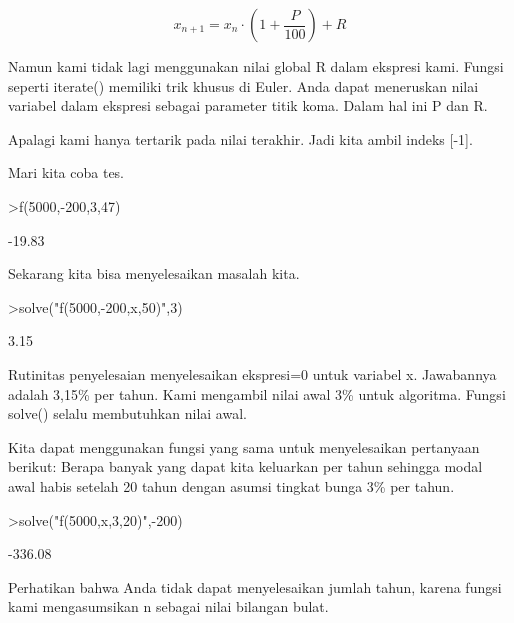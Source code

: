 \documentclass[a4paper,10pt]{article}
\begin{document}
\begin{eulernotebook}
\begin{eulercomment}
\begin{eulercomment}
\begin{eulercomment}
\begin{eulercomment}
\begin{eulercomment}
\begin{eulercomment}
\begin{eulercomment}
\begin{eulercomment}
\begin{eulercomment}
\end{eulercomment}
\begin{eulerformula}
\[
x_{n+1} = x_n \cdot \left(1+ \frac{P}{100}\right) + R
\]
\end{eulerformula}
\begin{eulercomment}
Namun kami tidak lagi menggunakan nilai global R dalam ekspresi kami.
Fungsi seperti iterate() memiliki trik khusus di Euler. Anda dapat
meneruskan nilai variabel dalam ekspresi sebagai parameter titik koma.
Dalam hal ini P dan R.

Apalagi kami hanya tertarik pada nilai terakhir. Jadi kita ambil
indeks [-1].

Mari kita coba tes.
\end{eulercomment}
\begin{eulerprompt}
>f(5000,-200,3,47)
\end{eulerprompt}
\begin{euleroutput}
       -19.83 
\end{euleroutput}
\begin{eulercomment}
Sekarang kita bisa menyelesaikan masalah kita.
\end{eulercomment}
\begin{eulerprompt}
>solve("f(5000,-200,x,50)",3)
\end{eulerprompt}
\begin{euleroutput}
         3.15 
\end{euleroutput}
\begin{eulercomment}
Rutinitas penyelesaian menyelesaikan ekspresi=0 untuk variabel x.
Jawabannya adalah 3,15\% per tahun. Kami mengambil nilai awal 3\% untuk
algoritma. Fungsi solve() selalu membutuhkan nilai awal.

Kita dapat menggunakan fungsi yang sama untuk menyelesaikan pertanyaan
berikut: Berapa banyak yang dapat kita keluarkan per tahun sehingga
modal awal habis setelah 20 tahun dengan asumsi tingkat bunga 3\% per
tahun.
\end{eulercomment}
\begin{eulerprompt}
>solve("f(5000,x,3,20)",-200)
\end{eulerprompt}
\begin{euleroutput}
      -336.08 
\end{euleroutput}
\begin{eulercomment}
Perhatikan bahwa Anda tidak dapat menyelesaikan jumlah tahun, karena
fungsi kami mengasumsikan n sebagai nilai bilangan bulat.


\end{eulercomment}
\end{eulercomment}
\end{eulercomment}
\end{eulercomment}
\end{eulercomment}
\end{eulercomment}
\end{eulercomment}
\end{eulercomment}
\end{eulercomment}
\end{eulernotebook}
\end{document}

